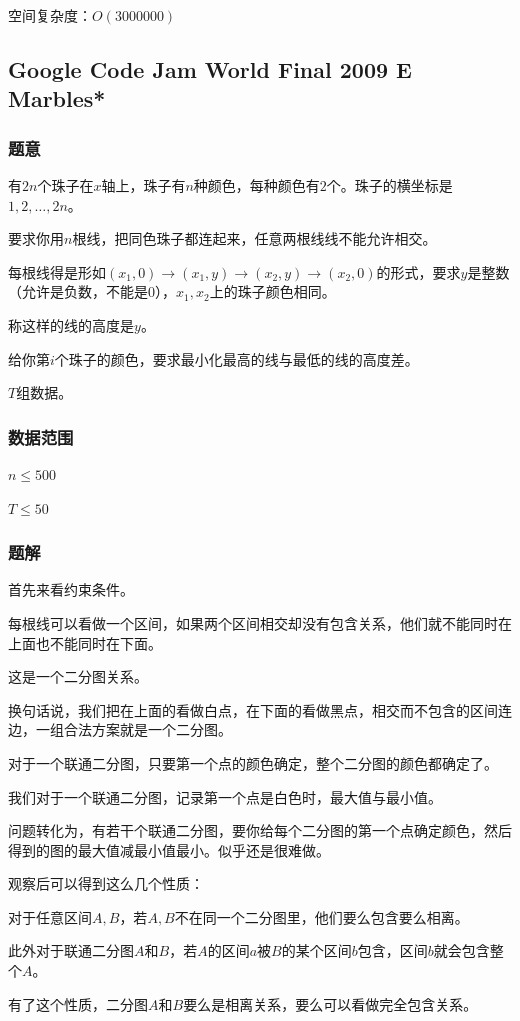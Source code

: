 \documentclass{ctexart}
\begin{document}
空间复杂度：$O(3000000)$
\subsection{Google Code Jam World Final 2009 E Marbles*}
\subsubsection{题意}
有$2n$个珠子在$x$轴上，珠子有$n$种颜色，每种颜色有$2$个。珠子的横坐标是$1,2,\ldots,2n$。

要求你用$n$根线，把同色珠子都连起来，任意两根线线不能允许相交。

每根线得是形如$(x_1,0) \rightarrow (x_1,y) \rightarrow (x_2,y) \rightarrow(x_2,0)$的形式，要求$y$是整数（允许是负数，不能是$0$），$x_1,x_2$上的珠子颜色相同。

称这样的线的高度是$y$。

给你第$i$个珠子的颜色，要求最小化最高的线与最低的线的高度差。

$T$组数据。
\subsubsection{数据范围}
$n \le 500$

$T \le 50$
\subsubsection{题解}
首先来看约束条件。

每根线可以看做一个区间，如果两个区间相交却没有包含关系，他们就不能同时在上面也不能同时在下面。

这是一个二分图关系。

换句话说，我们把在上面的看做白点，在下面的看做黑点，相交而不包含的区间连边，一组合法方案就是一个二分图。

对于一个联通二分图，只要第一个点的颜色确定，整个二分图的颜色都确定了。

我们对于一个联通二分图，记录第一个点是白色时，最大值与最小值。

问题转化为，有若干个联通二分图，要你给每个二分图的第一个点确定颜色，然后得到的图的最大值减最小值最小。似乎还是很难做。

观察后可以得到这么几个性质：

对于任意区间$A,B$，若$A,B$不在同一个二分图里，他们要么包含要么相离。

此外对于联通二分图$A$和$B$，若$A$的区间$a$被$B$的某个区间$b$包含，区间$b$就会包含整个$A$。

有了这个性质，二分图$A$和$B$要么是相离关系，要么可以看做完全包含关系。
\end{document}
